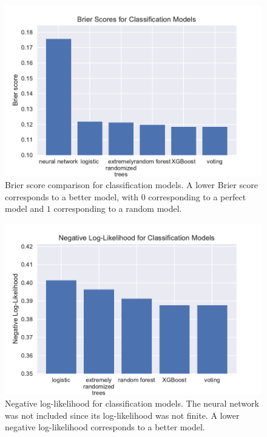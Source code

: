 \documentclass[12pt]{article}
\begin{document}
\begin{figure}[!htbp]
    \centering
    \includegraphics[width=\textwidth]{graphics/classification_brier}
    \caption{Brier score comparison for classification models. A lower Brier score corresponds to a better model, with $0$ corresponding to a perfect model and $1$ corresponding to a random model.}
    \label{fig:brier}
\end{figure}

\begin{figure}[!htbp]
    \centering
    \includegraphics[width=\textwidth]{graphics/classification_loglik}
    \caption{Negative log-likelihood for classification models. The neural network was not included since its log-likelihood was not finite. A lower negative log-likelihood corresponds to a better model.}
    \label{fig:log_likelihood}
\end{figure}
\end{document}
